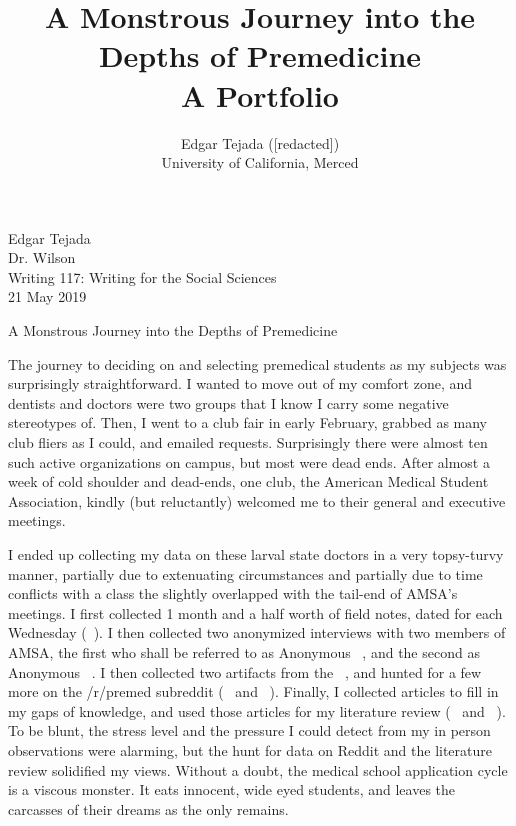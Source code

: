 \documentclass [12pt]{article}
\title{A Monstrous Journey into the Depths of Premedicine\\\medskip A Portfolio}
\author{Edgar Tejada ([redacted])\\University of California, Merced}
\begin{document}
\begin{flushleft}
Edgar Tejada\\
Dr. Wilson\\
Writing 117: Writing for the Social Sciences\\
21 May 2019\\


\begin{center}
	A Monstrous Journey into the Depths of Premedicine\\
\end{center}


\setlength{\parindent}{0.5in}
The journey to deciding on and selecting premedical students as my subjects was surprisingly straightforward. I wanted to move out of my comfort zone, and dentists and doctors were two groups that I know I carry some negative stereotypes of. Then, I went to a club fair in early February, grabbed as many club fliers as I could, and emailed requests. Surprisingly there were almost ten such active organizations on campus, but most were dead ends.
After almost a week of cold shoulder and dead-ends, one club, the American Medical Student Association, kindly (but reluctantly) welcomed me to their general and executive meetings.

I ended up collecting my data on these larval state doctors in a very topsy-turvy manner, partially due to extenuating circumstances and partially due to time conflicts with a class the slightly overlapped with the tail-end of AMSA's meetings. I first collected 1 month and a half worth of field notes, dated for each Wednesday (~\cite{TejadaField-2019}). I then collected two anonymized interviews with two members of AMSA, the first who shall be referred to as Anonymous ~\cite{subjectOne-2019}, and the second as Anonymous ~\cite{subjectTwo-2019}. I then collected two artifacts from the ~\cite{amsaStore-2019}, and hunted for a few more on the /r/premed subreddit (~\cite{twinkle-2019} and ~\cite{Udnomya-2019}). Finally, I collected articles to fill in my gaps of knowledge, and used those articles for my literature review (~\cite{Cooper-2013} and ~\cite{Olsen-2016}). To be blunt, the stress level and the pressure I could detect from my in person observations were alarming, but the hunt for data on Reddit and the literature review solidified my views. Without a doubt, the medical school application cycle is a viscous monster. It eats innocent, wide eyed students, and leaves the carcasses of their dreams as the only remains.



\newpage
\medskip %
\nocite{*} %
\printbibliography%

\end{flushleft}
\end{document}
